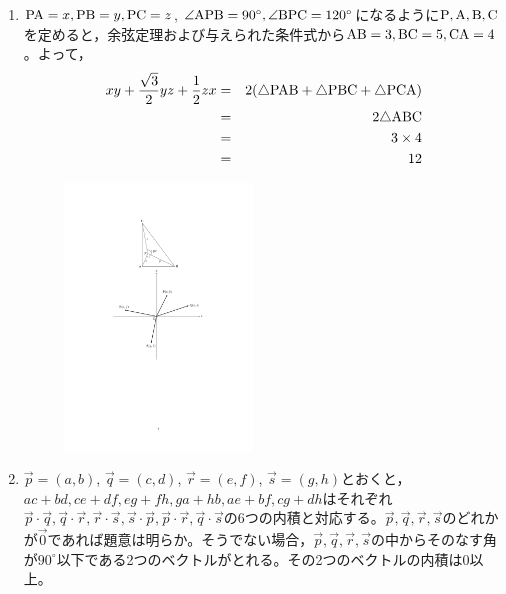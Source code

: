 \documentclass[a4paper,12pt,uplatex]{jsarticle}  %
\begin{document}
\begin{enumerate}
\item ${\rm PA}=x, {\rm PB}=y, {\rm PC}=z$, $\angle {\rm APB}=90^{\circ}, \angle {\rm BPC}=120^{\circ}$になるように$\rm P, A, B ,C$を定めると，余弦定理および与えられた条件式から${\rm AB}=3, {\rm BC}=5, {\rm CA}=4$。よって，
\begin{eqnarray*}
xy+\dfrac{\sqrt 3}{2}yz+\dfrac{1}{2}zx &=& 2(\triangle{\rm PAB}+\triangle{\rm PBC}+\triangle{\rm PCA})\\
&=&2 \triangle{\rm ABC}\\
&=&3\times 4\\
&=&12
\end{eqnarray*}


\begin{figure}[ht]
  \centering
  \includegraphics[width=5.0cm]{jizen_3_1_solution.pdf}
\end{figure}


\item 
$\overrightarrow{p}=(a,b)$, $\overrightarrow{q}=(c,d)$, $\overrightarrow{r}=(e,f)$, $\overrightarrow{s}=(g,h)$とおくと，$ac+bd, ce+df, eg+fh, ga+hb, ae+bf, cg+dh$はそれぞれ$\overrightarrow{p}\cdot\overrightarrow{q}, \overrightarrow{q}\cdot\overrightarrow{r}, \overrightarrow{r}\cdot\overrightarrow{s}, \overrightarrow{s}\cdot\overrightarrow{p}, \overrightarrow{p}\cdot\overrightarrow{r}, \overrightarrow{q}\cdot\overrightarrow{s}$の6つの内積と対応する。$\overrightarrow{p}, \overrightarrow{q}, \overrightarrow{r}, \overrightarrow{s}$のどれかが$\overrightarrow{0}$であれば題意は明らか。そうでない場合，$\overrightarrow{p}, \overrightarrow{q}, \overrightarrow{r}, \overrightarrow{s}$の中からそのなす角が$90^{\circ}$以下である2つのベクトルがとれる。その2つのベクトルの内積は0以上。




\end{enumerate}
\end{document}
